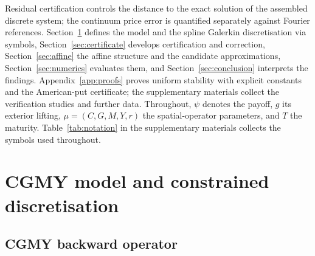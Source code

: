 \documentclass[hidelinks]{siamart251216}
\begin{document}
Residual certification controls the distance to the exact solution of the assembled discrete
system; the continuum price error is quantified separately against Fourier references.  Section~\ref{sec:model} defines the model and the spline
Galerkin discretisation via symbols, Section~\ref{sec:certificate} develops certification and
correction, Section~\ref{sec:affine} the affine structure and the candidate approximations,
Section~\ref{sec:numerics} evaluates them, and Section~\ref{sec:conclusion} interprets the
findings.  Appendix~\ref{app:proofs} proves uniform stability with explicit constants and the
American-put certificate; the supplementary materials collect the verification studies and further
data.  Throughout,
$\psi$ denotes the payoff, $g$ its exterior lifting, $\mu=(C,G,M,Y,r)$ the spatial-operator
parameters, and $T$ the maturity.
Table~\ref{tab:notation} in the supplementary materials collects the symbols used throughout.
\section{CGMY model and constrained discretisation}
\label{sec:model}\label{sec:galerkin}
\subsection{CGMY backward operator}
\label{ssec:operator}
\end{document}
